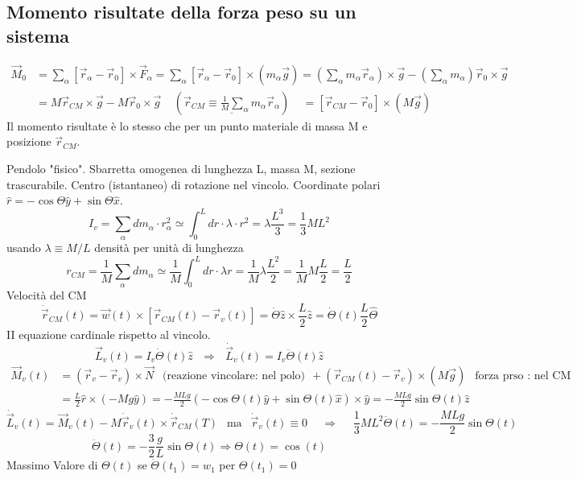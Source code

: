 \subsection{Momento risultate della forza peso su un sistema}
\begin{equation*}
    \begin{split}
        \vec{M}_0 & = \sum_{\alpha}[\vec{r}_{\alpha} - \vec{r}_0] \times \vec{F}_{\alpha} = \sum_{\alpha}[\vec{r}_{\alpha} - \vec{r}_0] \times (m_{\alpha}\vec{g}) = (\sum_{\alpha}m_{\alpha}\vec{r}_{\alpha}) \times \vec{g} - (\sum_{\alpha}m_{\alpha})\vec{r}_0 \times \vec{g}\\
                  & = M\vec{r}_{CM} \times \vec{g} - M\vec{r}_0 \times \vec{g} \:\:\:\:\:(\underline{\vec{r}_{CM} \equiv \frac{1}{M}\sum_{\alpha}m_{\alpha}\vec{r}_{\alpha}}) \:\:\:\:\: = [\vec{r}_{CM} - \vec{r}_0] \times (M\vec{g}) 
    \end{split}
\end{equation*}
Il momento risultate è lo stesso che per un punto materiale di massa M e posizione $\vec{r}_{CM}$.
\begin{example}
    Pendolo "fisico". Sbarretta omogenea di lunghezza L, massa M, sezione trascurabile. Centro (istantaneo) di rotazione nel vincolo.
    Coordinate polari $\hat{r} = -\cos\Theta\hat{y} + \sin\Theta\hat{x}$. 
    $$I_v = \sum_{\alpha}dm_{\alpha} \cdot r_{\alpha}^2 \simeq  \int_{0}^{L}dr \cdot \lambda \cdot r^2 = \lambda \frac{L^3}{3} = \frac{1}{3}ML^2$$
    usando $\lambda \equiv M/L$ densità per unità di lunghezza
    $$r_{CM} = \frac{1}{M}\sum_{\alpha}dm_{\alpha} \simeq \frac{1}{M} \int_{0}^{L} dr \cdot \lambda r = \frac{1}{M}\lambda \frac{L^2}{2} = \frac{1}{M}M \frac{L}{2} = \frac{L}{2}$$
    Velocità del CM
    $$\dot{\vec{r}}_{CM}(t) = \vec{w}(t) \times [\vec{r}_{CM}(t) - \vec{r}_v(t)] = \dot{\Theta}\hat{z} \times \frac{L}{2}\hat{z} = \dot{\Theta}(t) \frac{L}{2}\hat{\Theta}$$
    II equazione cardinale rispetto al vincolo.
    $$\vec{L}_v(t) = I_v\dot{\Theta}(t)\hat{z}\:\:\: \Rightarrow \:\:\: \dot{\vec{L}}_v(t) = I_v\ddot{\Theta}(t)\hat{z}$$
    \begin{equation*}
        \begin{split}
            \vec{M}_v(t) & = (\vec{r}_v - \vec{r}_v) \times \vec{N} \:\:\text{ (reazione vincolare: nel polo)}\:\: + (\vec{r}_{CM}(t) - \vec{r}_v) \times (M\vec{g}) \:\:\text{ forza prso : nel CM}\:\:\\
                         & = \frac{L}{2}\hat{r} \times (-Mg\hat{y}) = -\frac{MLg}{2}(-\cos\Theta(t)\hat{y} + \sin\Theta(t)\hat{x}) \times \hat{y} = -\frac{MLg}{2}\sin\Theta(t)\hat{z}
        \end{split}
    \end{equation*}
    $$\dot{\vec{L}}_v(t) = \vec{M}_v(t) - M\dot{\vec{r}}_v(t) \times \dot{\vec{r}}_{CM}(T) \:\:\text{ ma }\:\: \dot{\vec{r}}_v(t) \equiv 0 \hspace{15pt} \Rightarrow \hspace{15pt}\frac{1}{3}ML^2\ddot{\Theta}(t) = -\frac{MLg}{2}\sin\Theta(t)$$
    $$\ddot{\Theta}(t) = -\frac{3}{2}\frac{g}{L} \sin\Theta(t) \Rightarrow \Theta(t) = \cos(t)$$
    Massimo Valore di $\Theta(t)$ se $\dot{\Theta}(t_1) = w_1$ per $\Theta(t_1) = 0$
\end{example}
